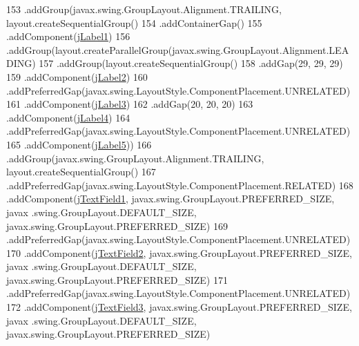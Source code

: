 \begin{DoxyCode}
153             .addGroup(javax.swing.GroupLayout.Alignment.TRAILING, layout.createSequentialGroup()
154                 .addContainerGap()
155                 .addComponent(\mbox{\hyperlink{class_interfaz_package_1_1_alta_libro_lectura_a356654b6ac16de88f1537402ce6b6258}{jLabel1}})
156                 .addGroup(layout.createParallelGroup(javax.swing.GroupLayout.Alignment.LEADING)
157                     .addGroup(layout.createSequentialGroup()
158                         .addGap(29, 29, 29)
159                         .addComponent(\mbox{\hyperlink{class_interfaz_package_1_1_alta_libro_lectura_adbfcbf3815dc0b6a49f8f73bfb381191}{jLabel2}})
160                         .addPreferredGap(javax.swing.LayoutStyle.ComponentPlacement.UNRELATED)
161                         .addComponent(\mbox{\hyperlink{class_interfaz_package_1_1_alta_libro_lectura_a8e3068311cd0998f45b8d16b5df07315}{jLabel3}})
162                         .addGap(20, 20, 20)
163                         .addComponent(\mbox{\hyperlink{class_interfaz_package_1_1_alta_libro_lectura_a0f93dcf00bc93a61d9fc78c0143d9bdf}{jLabel4}})
164                         .addPreferredGap(javax.swing.LayoutStyle.ComponentPlacement.UNRELATED)
165                         .addComponent(\mbox{\hyperlink{class_interfaz_package_1_1_alta_libro_lectura_a022dc8ebc55257499f93b99bddf47167}{jLabel5}}))
166                     .addGroup(javax.swing.GroupLayout.Alignment.TRAILING, layout.createSequentialGroup()
167                         .addPreferredGap(javax.swing.LayoutStyle.ComponentPlacement.RELATED)
168                         .addComponent(\mbox{\hyperlink{class_interfaz_package_1_1_alta_libro_lectura_aa23404c288ffab1e9e7e349e4336cc20}{jTextField1}}, javax.swing.GroupLayout.PREFERRED\_SIZE, javax
      .swing.GroupLayout.DEFAULT\_SIZE, javax.swing.GroupLayout.PREFERRED\_SIZE)
169                         .addPreferredGap(javax.swing.LayoutStyle.ComponentPlacement.UNRELATED)
170                         .addComponent(\mbox{\hyperlink{class_interfaz_package_1_1_alta_libro_lectura_a27642fe481c01e307cab4843cc5d86b8}{jTextField2}}, javax.swing.GroupLayout.PREFERRED\_SIZE, javax
      .swing.GroupLayout.DEFAULT\_SIZE, javax.swing.GroupLayout.PREFERRED\_SIZE)
171                         .addPreferredGap(javax.swing.LayoutStyle.ComponentPlacement.UNRELATED)
172                         .addComponent(\mbox{\hyperlink{class_interfaz_package_1_1_alta_libro_lectura_a51e44050eaeb982b64b831c47c61302f}{jTextField3}}, javax.swing.GroupLayout.PREFERRED\_SIZE, javax
      .swing.GroupLayout.DEFAULT\_SIZE, javax.swing.GroupLayout.PREFERRED\_SIZE)

\end{DoxyCode}
